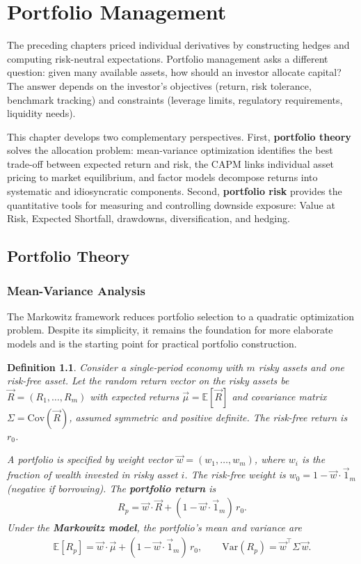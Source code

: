\documentclass{report}
\theoremstyle{spacedplain}
\theoremstyle{spaceddefinition}
\newtheorem{definition}[theorem]{Definition}
\theoremstyle{spacedremark}
\begin{document}
\chapter{Portfolio Management}

The preceding chapters priced individual derivatives by constructing hedges and computing risk-neutral expectations. Portfolio management asks a different question: given many available assets, how should an investor allocate capital? The answer depends on the investor's objectives (return, risk tolerance, benchmark tracking) and constraints (leverage limits, regulatory requirements, liquidity needs).

This chapter develops two complementary perspectives. First, \textbf{portfolio theory} solves the allocation problem: mean-variance optimization identifies the best trade-off between expected return and risk, the CAPM links individual asset pricing to market equilibrium, and factor models decompose returns into systematic and idiosyncratic components. Second, \textbf{portfolio risk} provides the quantitative tools for measuring and controlling downside exposure: Value at Risk, Expected Shortfall, drawdowns, diversification, and hedging.


\section{Portfolio Theory}

\subsection{Mean-Variance Analysis}

The Markowitz framework reduces portfolio selection to a quadratic optimization problem. Despite its simplicity, it remains the foundation for more elaborate models and is the starting point for practical portfolio construction.

\begin{definition}
Consider a single-period economy with $m$ risky assets and one risk-free asset. Let the random return vector on the risky assets be $\vec{R} = (R_1, \ldots, R_m)$ with expected returns $\vec{\mu} = \mathbb{E}[\vec{R}]$ and covariance matrix $\Sigma = \text{Cov}(\vec{R})$, assumed symmetric and positive definite. The risk-free return is $r_0$.

A portfolio is specified by weight vector $\vec{w} = (w_1, \ldots, w_m)$, where $w_i$ is the fraction of wealth invested in risky asset $i$. The risk-free weight is $w_0 = 1 - \vec{w} \cdot \vec{1}_m$ (negative if borrowing). The \textbf{portfolio return} is
\begin{align}
    R_p = \vec{w} \cdot \vec{R} + (1 - \vec{w} \cdot \vec{1}_m)\,r_0.
\end{align}
Under the \textbf{Markowitz model}, the portfolio's mean and variance are
\begin{align}
    \mathbb{E}[R_p] = \vec{w} \cdot \vec{\mu} + (1 - \vec{w} \cdot \vec{1}_m)\,r_0, \qquad \text{Var}(R_p) = \vec{w}^\top \Sigma\, \vec{w}.
\end{align}
\end{definition}
\end{document}
